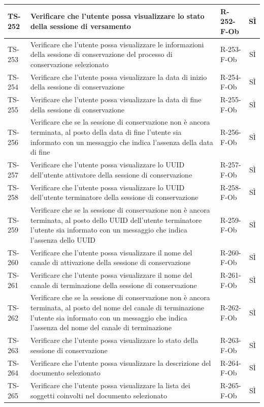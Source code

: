 \documentclass[a4paper,12pt]{article}
\begin{document}
\begin{longtable}{|p{1.5cm}|p{8.3cm}|p{2.4cm}|c|}
\hline
TS-252 & Verificare che l'utente possa visualizzare lo stato della sessione di versamento & R-252-F-Ob & SÌ \\
\hline
TS-253 & Verificare che l'utente possa visualizzare le informazioni della sessione di conservazione del processo di conservazione selezionato & R-253-F-Ob & SÌ \\
\hline
TS-254 & Verificare che l'utente possa visualizzare la data di inizio della sessione di conservazione & R-254-F-Ob & SÌ \\
\hline
TS-255 & Verificare che l'utente possa visualizzare la data di fine della sessione di conservazione & R-255-F-Ob & SÌ \\
\hline
TS-256 & Verificare che se la sessione di conservazione non è ancora terminata, al posto della data di fine l'utente sia informato con un messaggio che indica l'assenza della data di fine & R-256-F-Ob & SÌ \\
\hline
TS-257 & Verificare che l'utente possa visualizzare lo UUID dell'utente attivatore della sessione di conservazione & R-257-F-Ob & SÌ \\
\hline
TS-258 & Verificare che l'utente possa visualizzare lo UUID dell'utente terminatore della sessione di conservazione & R-258-F-Ob & SÌ \\
\hline
TS-259 & Verificare che se la sessione di conservazione non è ancora terminata, al posto dello UUID dell'utente terminatore l'utente sia informato con un messaggio che indica l'assenza dello UUID & R-259-F-Ob & SÌ \\
\hline
TS-260 & Verificare che l'utente possa visualizzare il nome del canale di attivazione della sessione di conservazione & R-260-F-Ob & SÌ \\
\hline
TS-261 & Verificare che l'utente possa visualizzare il nome del canale di terminazione della sessione di conservazione & R-261-F-Ob & SÌ \\
\hline
TS-262 & Verificare che se la sessione di conservazione non è ancora terminata, al posto del nome del canale di terminazione l'utente sia informato con un messaggio che indica l'assenza del nome del canale di terminazione & R-262-F-Ob & SÌ \\
\hline
TS-263 & Verificare che l'utente possa visualizzare lo stato della sessione di conservazione & R-263-F-Ob & SÌ \\
\hline
TS-264 & Verificare che l'utente possa visualizzare la descrizione del documento selezionato & R-264-F-Ob & SÌ \\
\hline
TS-265 & Verificare che l'utente possa visualizzare la lista dei soggetti coinvolti nel documento selezionato & R-265-F-Ob & SÌ \\

\end{longtable}
\end{document}
